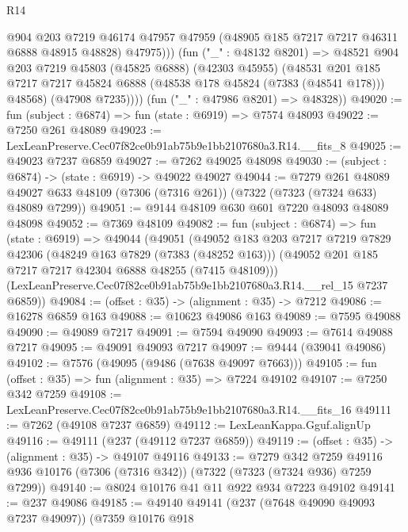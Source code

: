 \begin{lexlean}{R14}
\begin{coremodule}
                @904
                @203
                @7219
                @46174
                @47957
                @47959
                (@48905 @185 @7217 @7217 @46311 @6888 @48915 @48828)
                @47975)))
          (fun ("_" : @48132 @8201) =>
          @48521
            @904
            @203
            @7219
            @45803
            (@45825 @6888)
            (@42303 @45955)
            (@48531
              @201
              @185
              @7217
              @7217
              @45824
              @6888
              (@48538 @178 @45824 (@7383 (@48541 @178)))
              @48568)
            (@47908 @7235))))
      (fun ("_" : @47986 @8201) => @48328))
@49020 := fun (subject : @6874) => fun (state : @6919) => @7574 @48093
@49022 := @7250 @261 @48089
@49023 := LexLeanPreserve.Cec07f82ce0b91ab75b9e1bb2107680a3.R14.__fits_8
@49025 := @49023 @7237 @6859
@49027 := @7262 @49025 @48098
@49030 := (subject : @6874) -> (state : @6919) -> @49022 @49027
@49044 := @7279
    @261
    @48089
    @49027
    @633
    @48109
    (@7306 (@7316 @261))
    (@7322 (@7323 (@7324 @633) @48089 @7299))
@49051 := @9144 @48109 @630 @601 @7220 @48093 @48089 @48098
@49052 := @7369 @48109
@49082 := fun (subject : @6874) =>
  fun (state : @6919) =>
  @49044
    (@49051
      (@49052
        @183
        @203
        @7217
        @7219
        @7829
        @42306
        (@48249 @163 @7829 (@7383 (@48252 @163)))
        (@49052 @201 @185 @7217 @7217 @42304 @6888 @48255 (@7415 @48109)))
      (LexLeanPreserve.Cec07f82ce0b91ab75b9e1bb2107680a3.R14.__rel_15 @7237 @6859))
@49084 := (offset : @35) -> (alignment : @35) -> @7212
@49086 := @16278 @6859 @163
@49088 := @10623 @49086 @163
@49089 := @7595 @49088
@49090 := @49089 @7217
@49091 := @7594 @49090
@49093 := @7614 @49088 @7217
@49095 := @49091 @49093 @7217
@49097 := @9444 (@39041 @49086)
@49102 := @7576 (@49095 (@9486 (@7638 @49097 @7663)))
@49105 := fun (offset : @35) => fun (alignment : @35) => @7224 @49102
@49107 := @7250 @342 @7259
@49108 := LexLeanPreserve.Cec07f82ce0b91ab75b9e1bb2107680a3.R14.__fits_16
@49111 := @7262 (@49108 @7237 @6859)
@49112 := LexLeanKappa.Gguf.alignUp
@49116 := @49111 (@237 (@49112 @7237 @6859))
@49119 := (offset : @35) -> (alignment : @35) -> @49107 @49116
@49133 := @7279
    @342
    @7259
    @49116
    @936
    @10176
    (@7306 (@7316 @342))
    (@7322 (@7323 (@7324 @936) @7259 @7299))
@49140 := @8024 @10176 @41 @11 @922 @934 @7223 @49102
@49141 := @237 @49086
@49185 := @49140
    @49141
    (@237 (@7648 @49090 @49093 @7237 @49097))
    (@7359
      @10176
      @918

\end{coremodule}
\end{lexlean}
